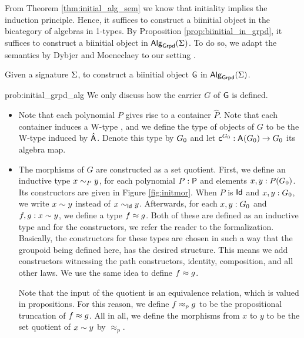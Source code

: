 From Theorem \ref{thm:initial_alg_sem} we know that initiality implies the induction principle.
Hence, it suffices to construct a biinitial object in the bicategory of algebras in 1-types.
By Proposition \ref{prop:biinitial_in_grpd}, it suffices to construct a biinitial object in $\algG{\sign}$.
To do so, we adapt the semantics by Dybjer and Moeneclaey to our setting \cite{DBLP:journals/entcs/DybjerM18}.

\begin{problem}
\label{prob:initial_grpd_alg}
Given a signature $\sign$, to construct a biinitial object  $\constfont{G}$ in $\algG{\sign}$.
\end{problem}

\begin{construction}{prob:initial_grpd_alg}
\label{constr:initial_grpd_alg}
We only discuss how the carrier $G$ of $\constfont{G}$ is defined.
\begin{itemize}
	\item Note  that each polynomial $P$ gives rise to a container $\hat{P}$.
	Note that each container induces a W-type \cite{abbott2003categories},
	and we define the type of objects of $G$ to be the W-type induced by $\hat{\pointconstr}$.
	Denote this type by $\initob$ and let $\constfont{c}^{\initob} : \pointconstr(\initob) \to \initob$ its algebra map.
	\item The morphisms of $G$ are constructed as a set quotient.
	First, we define an inductive type $\initmorgen{P}{x}{y}$, for each polynomial $P :\poly$ and elements $x, y : P (\initob)$. Its constructors are given in Figure \ref{fig:initmor}.
        When $P$ is $\idP$ and $x,y : \initob$, we write $\initmor{x}{y}$ instead of $\initmorgen{\idP}{x}{y}$. Afterwards, for each $x, y : \initob$ and $f, g : \initmor{x}{y}$, we define a type $\initeq{f}{g}$.
	Both of these are defined as an inductive type and for the constructors, we refer the reader to the formalization.
	Basically, the constructors for these types are chosen in such a way that the groupoid being defined here, has the desired structure.
	This means we add constructors witnessing the path constructors, identity, composition, and all other laws.
	We use the same idea to define $\initeq{f}{g}$.
	
	Note that the input of the quotient is an equivalence relation, which is valued in propositions.
	For this reason, we define $\initeqprop{f}{g}$ to be the propositional truncation of $\initeq{f}{g}$.
	All in all, we define the morphisms from $x$ to $y$ to be the set quotient of $\initmor{x}{y}$ by $\approx_p$.
	\qedhere	
\end{itemize}
\end{construction}

